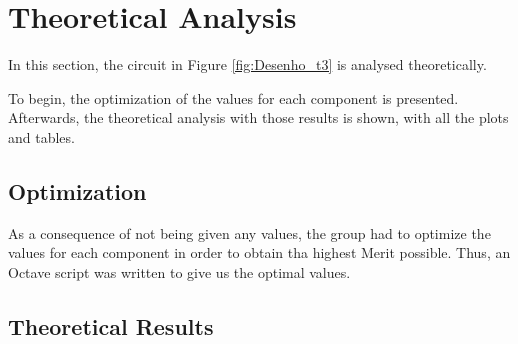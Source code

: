 
\section{Theoretical Analysis}
\label{sec:analysis}



In this section, the circuit in Figure \ref{fig:Desenho_t3} is analysed theoretically.

To begin, the optimization of the values for each component is presented. Afterwards,
the theoretical analysis with those results is shown, with all the plots and tables.



\subsection{Optimization}
\label{subsec:optim}

As a consequence of not being given any values, the group had to optimize the values
for each component in order to obtain tha highest Merit possible. Thus, an Octave script
was written to give us the optimal values.



\subsection{Theoretical Results}
\label{subsec:res_the}

